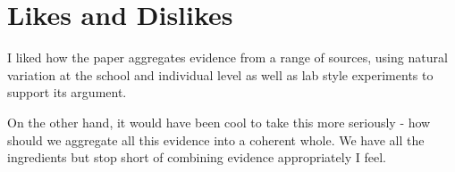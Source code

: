 \documentclass{article}
\begin{document}
\section*{Likes and Dislikes}

I liked how the paper aggregates evidence from a range of sources, using 
natural variation at the school and individual level as well as lab style 
experiments to support its argument.

On the other hand, it would have been cool to take this more seriously - how 
should we aggregate all this evidence into a coherent whole. We have all the 
ingredients but stop short of combining evidence appropriately I feel.











    
\end{document}
